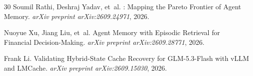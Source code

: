 \documentclass[11pt,a4paper]{article}
\begin{document}
\begin{thebibliography}{30}
Soumil Rathi, Deshraj Yadav, et~al.
: Mapping the Pareto Frontier of Agent Memory.
\newblock \emph{arXiv preprint arXiv:2609.24971}, 2026.

Nuoyue Xu, Jiang Liu, et~al.
\newblock Agent Memory with Episodic Retrieval for Financial Decision-Making.
\newblock \emph{arXiv preprint arXiv:2609.28771}, 2026.

Frank Li.
\newblock Validating Hybrid-State Cache Recovery for {GLM-5.3-Flash} with {vLLM} and {LMCache}.
\newblock \emph{arXiv preprint arXiv:2609.15030}, 2026.

\end{thebibliography}
\end{document}
